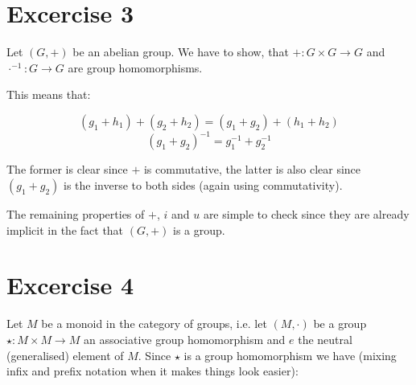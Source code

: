 \documentclass{scrartcl}
\begin{document}
    
    \section*{Excercise 3} Let $(G,+)$ be an abelian group. We have to show, that $+ : G × G → G$ and $·^{-1} : G → G$ are group homomorphisms.
    
    This means that:
    
    \[ (g_1 + h_1) + (g_2 + h_2) = (g_1 + g_2) + (h_1 + h_2) \]
    \[ (g_1 + g_2)^{-1} = g_1^{-1} + g_2^{-1} \]
    
    The former is clear since $+$ is commutative, the latter is also clear since $(g_1 + g_2)$ is the inverse to both sides (again using commutativity).
    
    The remaining properties of $+$, $i$ and $u$ are simple to check since they are already implicit in the fact that $(G,+)$ is a group.
    
    \section*{Excercise 4} Let $M$ be a monoid in the category of groups, i.e. let $(M, ·)$ be a group $\star: M×M → M$ an associative group homomorphism and $e$ the neutral (generalised) element of $M$. Since $\star$ is a group homomorphism we have (mixing infix and prefix notation when it makes things look easier):
    
\end{document}
